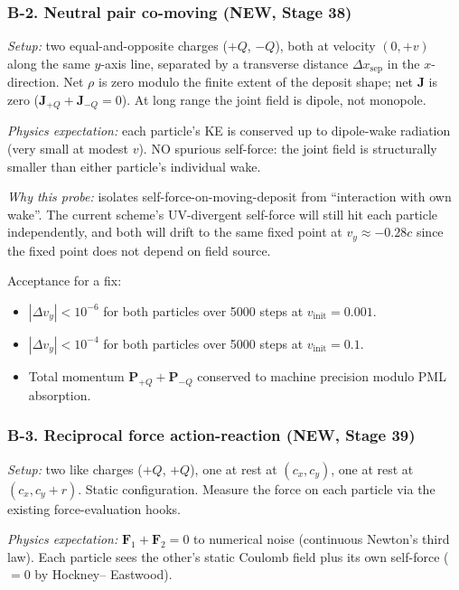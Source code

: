 \documentclass[11pt,a4paper]{article}
\newcommand{\vv}[1]{\mathbf{#1}}
\begin{document}
\subsubsection*{B-2.  Neutral pair co-moving (NEW, Stage 38)}

\emph{Setup:} two equal-and-opposite charges ($+Q$, $-Q$), both at
velocity $(0, +v)$ along the same $y$-axis line, separated by a
transverse distance $\Delta x_{\mathrm{sep}}$ in the $x$-direction.
Net $\rho$ is zero modulo the finite extent of the deposit shape; net
$\vv{J}$ is zero ($\vv{J}_{+Q} + \vv{J}_{-Q} = 0$).  At long range
the joint field is dipole, not monopole.

\emph{Physics expectation:} each particle's KE is conserved up to
dipole-wake radiation (very small at modest $v$).  NO spurious
self-force: the joint field is structurally smaller than either
particle's individual wake.

\emph{Why this probe:} isolates self-force-on-moving-deposit from
``interaction with own wake''.  The current scheme's UV-divergent
self-force will still hit each particle independently, and both will
drift to the same fixed point at $v_y \approx -0.28c$ since the fixed
point does not depend on field source.

Acceptance for a fix:
\begin{itemize}
  \item $|\Delta v_y| < 10^{-6}$ for both particles over 5000 steps
    at $v_{\mathrm{init}} = 0.001$.
  \item $|\Delta v_y| < 10^{-4}$ for both particles over 5000 steps
    at $v_{\mathrm{init}} = 0.1$.
  \item Total momentum $\vv{P}_{+Q} + \vv{P}_{-Q}$ conserved to
    machine precision modulo PML absorption.
\end{itemize}

\subsubsection*{B-3.  Reciprocal force action-reaction (NEW, Stage 39)}

\emph{Setup:} two like charges ($+Q$, $+Q$), one at rest at
$(c_x, c_y)$, one at rest at $(c_x, c_y + r)$.  Static configuration.
Measure the force on each particle via the existing
force-evaluation hooks.

\emph{Physics expectation:} $\vv{F}_1 + \vv{F}_2 = 0$ to numerical
noise (continuous Newton's third law).  Each particle sees the other's
static Coulomb field plus its own self-force ($= 0$ by Hockney--
Eastwood).
\end{document}
